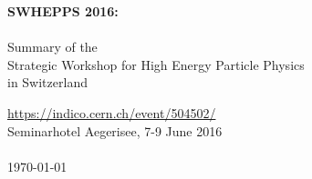 \documentclass[10pt,a4paper,draft]{article}
\begin{document}
\pagestyle{plain}
\begin{center}
{\large {\bf  SWHEPPS 2016:}\\
\ ~\\
Summary of the\\
 Strategic Workshop for High Energy Particle Physics \\
  in Switzerland }\\
\vspace{6cm}

\url{https://indico.cern.ch/event/504502/}  ~\\
Seminarhotel Aegerisee, 7-9 June 2016 \\
\  ~\\
\vspace{-0.4cm}
\today \\
\end{center}
\end{document}
